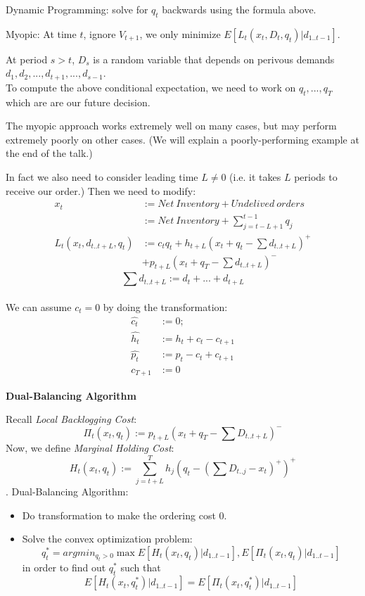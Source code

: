 \documentclass[twoside]{article}
\begin{document}
\begin{multicols}{2}
\begin{compactitem}
        Dynamic Programming: solve for $q_t$ backwards using the formula above.
      \item
        Myopic: At time $t$, ignore $V_{t+1}$, we only minimize $E[L_t(x_t,D_t,q_t)|d_{1..t-1}]$.
      \item 
        At period $s>t$, $D_s$ is a random variable that depends on perivous demands $d_1, d_2,...,d_{t+1},...,d_{s-1}$.\\
        To compute the above conditional expectation, we need to work on $q_t,...,q_T$ which are are our future decision.
      \item
        The myopic approach works extremely well on many cases\cite{CLAcha1}, but may perform extremely poorly on other cases. (We will explain a poorly-performing example at the end of the talk.)
    \end{compactitem}
    In fact we also need to consider leading time $L \neq 0$ (i.e. it takes $L$ periods to receive our order.) Then we need to modify:
        \begin{align}
          x_t & := Net~Inventory + Undelived~orders\nonumber\\
              & := Net~Inventory + \sum_{j = t - L+1}^{t-1} q_j\nonumber\\
          L_t(x_t,d_{t..t+L},q_t)& :=c_tq_t + h_{t+L}(x_t + q_t - \sum d_{t..t+L})^{+} \nonumber\\
                                &  + p_{t+L}(x_t + q_T - \sum d_{t..t+L})^{-}\nonumber
        \end{align}
        \[ \sum d_{t..t+L} := d_t + ... + d_{t+L}\]\\
    We can assume $c_t = 0$ by doing the transformation:
        \begin{align}
          \hat{c_t} &:= 0;\nonumber\\
          \hat{h_t} &:= h_t + c_t - c_{t+1}\nonumber\\
          \hat{p_t} &:= p_t - c_t + c_{t+1}\nonumber\\
          c_{T+1} &:= 0\nonumber
        \end{align}

    \textbf{Dual-Balancing Algorithm}\cite{CLAcha2}

    Recall {\em Local Backlogging Cost}:
    $$\Pi_t(x_t,q_t) := p_{t+L}(x_t + q_T - \sum D_{t..t+L})^{-}$$
    Now, we define {\em Marginal Holding Cost}:
    $$H_t(x_t,q_t) := \sum_{j = t+L}^{T} h_j (q_t - (\sum D_{t..j} - x_t)^+)^+$$.
    Dual-Balancing Algorithm:
    \begin{itemize}
      \item 
        Do transformation to make the ordering cost 0.
      \item
        Solve the convex optimization problem:
        $$q_t^* = argmin_{q_t > 0} \max{E[H_t(x_t,q_t)| d_{1..t-1}], E[\Pi_t(x_t,q_t)| d_{1..t-1}]}$$
        in order to find out $q_t^*$ such that
        $$E[H_t(x_t,q_t^*)| d_{1..t-1}] = E[\Pi_t(x_t,q_t^*)| d_{1..t-1}]$$
    \end{itemize}
\lipsum[4] %


\end{multicols}
\end{document}
